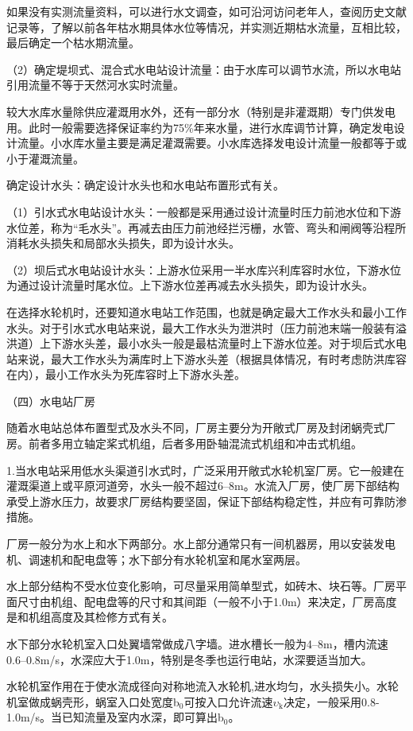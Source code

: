 \documentclass{ctexbook}
\begin{document}
如果没有实测流量资料，可以进行水文调查，如可沿河访问老年人，查阅历史文献记录等，了解以前各年枯水期具体水位等情况，并实测近期枯水流量，互相比较，最后确定一个枯水期流量。

（2）确定堤坝式、混合式水电站设计流量：由于水库可以调节水流，所以水电站引用流量不等于天然河水实时流量。

较大水库水量除供应灌溉用水外，还有一部分水（特别是非灌溉期）专门供发电用。此时一般需要选择保证率约为75\%年来水量，进行水库调节计算，确定发电设计流量。小水库水量主要是满足灌溉需要。小水库选择发电设计流量一般都等于或小于灌溉流量。

确定设计水头：确定设计水头也和水电站布置形式有关。

（1）引水式水电站设计水头：一般都是采用通过设计流量时压力前池水位和下游水位差，称为“毛水头”。再减去由压力前池经拦污栅，水管、弯头和闸阀等沿程所消耗水头损失和局部水头损失，即为设计水头。

（2）坝后式水电站设计水头：上游水位采用一半水库兴利库容时水位，下游水位为通过设计流量时尾水位。上下游水位差再减去水头损失，即为设计水头。

在选择水轮机时，还要知道水电站工作范围，也就是确定最大工作水头和最小工作水头。对于引水式水电站来说，最大工作水头为泄洪时（压力前池末端一般装有溢洪道）上下游水头差，最小水头一般是最枯流量时上下游水位差。对于坝后式水电站来说，最大工作水头为满库时上下游水头差（根据具体情况，有时考虑防洪库容在内），最小工作水头为死库容时上下游水头差。

（四）水电站厂房

随着水电站总体布置型式及水头不同，厂房主要分为开敞式厂房及封闭蜗壳式厂房。前者多用立轴定桨式机组，后者多用卧轴混流式机组和冲击式机组。

1.当水电站采用低水头渠道引水式时，广泛采用开敞式水轮机室厂房。它一般建在灌溉渠道上或平原河道旁，水头一般不超过6--8m。水流入厂房，使厂房下部结构承受上游水压力，故要求厂房结构要坚固，保证下部结构稳定性，并应有可靠防渗措施。

厂房一般分为水上和水下两部分。水上部分通常只有一间机器房，用以安装发电机、调速机和配电盘等；水下部分有水轮机室和尾水室两层。

水上部分结构不受水位变化影响，可尽量采用简单型式，如砖木、块石等。厂房平面尺寸由机组、配电盘等的尺寸和其间距（一般不小于1.0m）来决定，厂房高度是和机组高度及其检修方式有关。

水下部分水轮机室入口处翼墙常做成八字墙。进水槽长一般为4--8m，槽内流速0.6--0.8m/s，水深应大于1.0m，特别是冬季也运行电站，水深要适当加大。

水轮机室作用在于使水流成径向对称地流入水轮机,进水均匀，水头损失小。水轮机室做成蜗壳形，蜗室入口处宽度b$_0$可按入口允许流速$\upsilon_{\text{k}}$决定，一般采用0.8-1.0m/s。当已知流量及室内水深，即可算出b$_0$。
\end{document}
